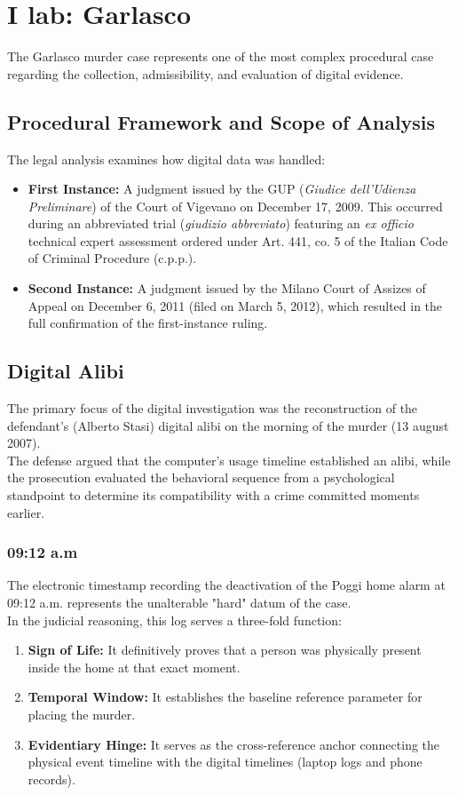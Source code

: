 \section{I lab: Garlasco}

The Garlasco murder case represents one of the most complex procedural case regarding the collection, admissibility, and evaluation of digital evidence.\\

\subsection{Procedural Framework and Scope of Analysis}
The legal analysis examines how digital data was handled:
\begin{itemize}
    \item \textbf{First Instance:} A judgment issued by the GUP (\textit{Giudice dell'Udienza Preliminare}) of the Court of Vigevano on December 17, 2009. This occurred during an abbreviated trial (\textit{giudizio abbreviato}) featuring an \textit{ex officio} technical expert assessment ordered under Art. 441, co. 5 of the Italian Code of Criminal Procedure (c.p.p.).
    \item \textbf{Second Instance:} A judgment issued by the Milano Court of Assizes of Appeal on December 6, 2011 (filed on March 5, 2012), which resulted in the full confirmation of the first-instance ruling.
\end{itemize}



\subsection{Digital Alibi}
The primary focus of the digital investigation was the reconstruction of the defendant's (Alberto Stasi) digital alibi on the morning of the murder (13 august 2007).\\
The defense argued that the computer's usage timeline established an alibi, while the prosecution evaluated the behavioral sequence from a psychological standpoint to determine its compatibility with a crime committed moments earlier.

\subsubsection*{09:12 a.m}
The electronic timestamp recording the deactivation of the Poggi home alarm at 09:12 a.m. represents the unalterable "hard" datum of the case.\\
In the judicial reasoning, this log serves a three-fold function:
\begin{enumerate}
    \item \textbf{Sign of Life:} It definitively proves that a person was physically present inside the home at that exact moment.
    \item \textbf{Temporal Window:} It establishes the baseline reference parameter for placing the murder.
    \item \textbf{Evidentiary Hinge:} It serves as the cross-reference anchor connecting the physical event timeline with the digital timelines (laptop logs and phone records).
\end{enumerate}


